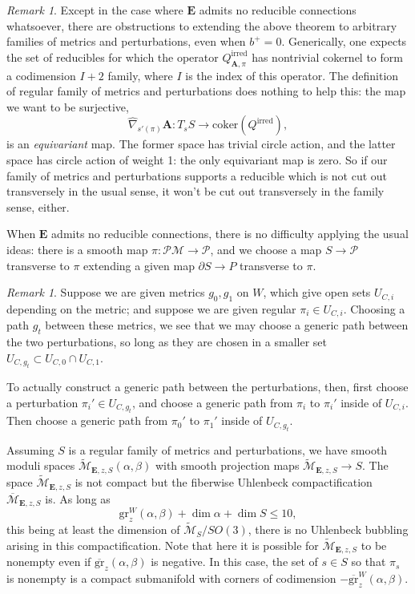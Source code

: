 \documentclass[10pt,a4paper]{amsart}
\theoremstyle{definition}
\theoremstyle{remark}
\newtheorem{remark}[theorem]{Remark}
\numberwithin{figure}{qchap}
\begin{document}
\begin{remark}Except in the case where $\mathbf{E}$ admits no reducible connections whatsoever, there are obstructions to extending the above theorem to arbitrary families of metrics and perturbations, even when $b^+ = 0$. Generically, one expects the set of reducibles for which the operator $Q^{\text{irred}}_{\mathbf{A},\pi}$ has nontrivial cokernel to form a codimension $I+2$ family, where $I$ is the index of this operator. The definition of regular family of metrics and perturbations does nothing to help this: the map we want to be surjective, $$\widehat{\nabla}_{s'(\pi)} \mathbf{A} : T_s S \to \text{coker}(Q^{\text{irred}}),$$ is an \emph{equivariant} map. The former space has trivial circle action, and the latter space has circle action of weight 1: the only equivariant map is zero. So if our family of metrics and perturbations supports a reducible which is not cut out transversely in the usual sense, it won't be cut out transversely in the family sense, either.

When $\mathbf{E}$ admits no reducible connections, there is no difficulty applying the usual ideas: there is a smooth map $\pi: \mathcal P \mathcal M \to \mathcal P$, and we choose a map $S \to \mathcal P$ transverse to $\pi$ extending a given map $\partial S \to P$ transverse to $\pi$.
\end{remark}

\begin{remark}\label{interpolate}Suppose we are given metrics $g_0, g_1$ on $W$, which give open sets $U_{C,i}$ depending on the metric; and suppose we are given regular $\pi_i \in U_{C,i}$. Choosing a path $g_t$ between these metrics, we see that we may choose a generic path between the two perturbations, so long as they are chosen in a smaller set $U_{C,g_t} \subset U_{C,0} \cap U_{C,1}$.

To actually construct a generic path between the perturbations, then, first choose a perturbation $\pi_i' \in U_{C,g_t}$, and choose a generic path from $\pi_i$ to $\pi_i'$ inside of $U_{C,i}$. Then choose a generic path from $\pi_0'$ to $\pi_1'$ inside of $U_{C,g_t}$.
\end{remark}

Assuming $S$ is a regular family of metrics and perturbations, we have smooth moduli spaces $\widetilde{\mathcal M}_{\mathbf{E},z,S}(\alpha, \beta)$ with smooth projection maps $\widetilde{\mathcal M}_{\mathbf{E},z,S} \to S$. The space $\widetilde{\mathcal M}_{\mathbf{E},z,S}$ is not compact but the fiberwise Uhlenbeck compactification $\overline{\mathcal M}_{\mathbf{E},z,S}$ is. As long as
$$\text{gr}^W_z(\alpha, \beta) + \dim \alpha + \dim S \leq 10,$$
this being at least the dimension of $\widetilde{\mathcal M}_S/SO(3)$, there is no Uhlenbeck bubbling arising in this compactification. Note that here it is possible for $\widetilde{\mathcal M}_{\mathbf{E},z,S}$ to be nonempty even if $\overline{\text{gr}}_z(\alpha,\beta)$ is negative. In this case, the set of $s \in S$ so that $\pi_s$ is nonempty is a compact submanifold with corners of codimension $-\overline{\text{gr}}^W_z(\alpha, \beta)$.
\end{document}
